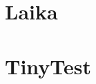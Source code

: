 \documentclass[brudnopis]{xmgr}
\begin{document}

\chapter{Laika}


\chapter{TinyTest}







\listoftables

\listoffigures

\oswiadczenie
\end{document}
